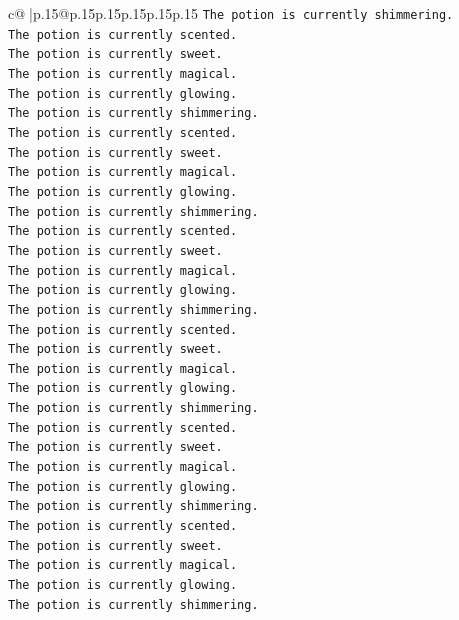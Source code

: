 \documentclass{article}
\begin{document}
{\begin{supertabular}{c@{$\;$}|p{.15\linewidth}@{}p{.15\linewidth}p{.15\linewidth}p{.15\linewidth}p{.15\linewidth}p{.15\linewidth}}
{{{\texttt{The potion is currently shimmering.} \\
\texttt{The potion is currently scented.} \\
\texttt{The potion is currently sweet.} \\
\texttt{The potion is currently magical.} \\
\texttt{The potion is currently glowing.} \\
\texttt{The potion is currently shimmering.} \\
\texttt{The potion is currently scented.} \\
\texttt{The potion is currently sweet.} \\
\texttt{The potion is currently magical.} \\
\texttt{The potion is currently glowing.} \\
\texttt{The potion is currently shimmering.} \\
\texttt{The potion is currently scented.} \\
\texttt{The potion is currently sweet.} \\
\texttt{The potion is currently magical.} \\
\texttt{The potion is currently glowing.} \\
\texttt{The potion is currently shimmering.} \\
\texttt{The potion is currently scented.} \\
\texttt{The potion is currently sweet.} \\
\texttt{The potion is currently magical.} \\
\texttt{The potion is currently glowing.} \\
\texttt{The potion is currently shimmering.} \\
\texttt{The potion is currently scented.} \\
\texttt{The potion is currently sweet.} \\
\texttt{The potion is currently magical.} \\
\texttt{The potion is currently glowing.} \\
\texttt{The potion is currently shimmering.} \\
\texttt{The potion is currently scented.} \\
\texttt{The potion is currently sweet.} \\
\texttt{The potion is currently magical.} \\
\texttt{The potion is currently glowing.} \\
\texttt{The potion is currently shimmering.} \\
}}}
\end{supertabular}}
\end{document}
